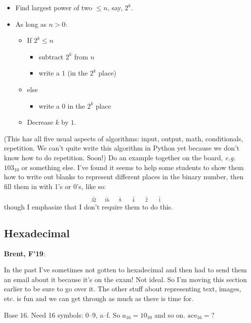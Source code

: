 \documentclass{article}
\newcommand{\eg}{\emph{e.g.}\xspace}
\newenvironment{reflect}[1]
{
  \noindent
  \begin{lrbox}{\reflectbox}
    \begin{minipage}[t]{\textwidth}
      \textbf{#1}:
}{
    \end{minipage}
  \end{lrbox}
  \fbox{\usebox{\reflectbox}}
}
\begin{document}
\begin{itemize}
\item Find largest power of two $\leq n$, say, $2^k$.
\item As long as $n > 0$:
  \begin{itemize}
  \item If $2^k \leq n$
    \begin{itemize}
    \item subtract $2^k$ from $n$
    \item write a $1$ (in the $2^k$ place)
    \end{itemize}
  \item else
    \begin{itemize}
    \item  write a $0$ in the $2^k$ place
    \end{itemize}
  \item Decrease $k$ by $1$.
  \end{itemize}
\end{itemize}

(This has all five usual aspects of algorithms: input, output, math,
conditionals, repetition.  We can't quite write this algorithm in
Python yet because we don't know how to do repetition.  Soon!)  Do an
example together on the board, \eg $103_{10}$ or something else. I've
found it seems to help some students to show them how to write out
blanks to represent different places in the binary number, then fill
them in with 1's or 0's, like so:
\[ \underset{32}{\underline{\phantom{XX}}} \; \underset{16}{\underline{\phantom{XX}}} \; \underset{8}{\underline{\phantom{XX}}} \; \underset{4}{\underline{\phantom{XX}}} \; \underset{2}{\underline{\phantom{XX}}} \; \underset{1}{\underline{\phantom{XX}}} \]
though I emphasize that I don't require them to do this.

\subsection*{Hexadecimal}

\begin{reflect}{Brent, F'19}
  In the past I've sometimes not gotten to hexadecimal and then had to
  send them an email about it because it's on the exam!  Not ideal.
  So I'm moving this section earlier to be sure to go over it.  The
  other stuff about representing text, images, etc. is fun and we can
  get through as much as there is time for.
\end{reflect}

Base $16$.  Need 16 symbols: 0--9, a--f. So $a_{16} = 10_{10}$ and so
on. $\mbox{ace}_{16} = ?$
\end{document}

